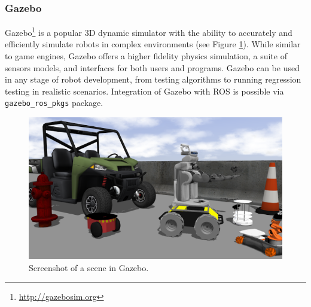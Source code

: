 \subsubsection{Gazebo} 
Gazebo\footnote{\url{http://gazebosim.org}} is a popular 3D dynamic simulator with the ability to accurately and efficiently simulate robots in complex environments (see Figure \ref{gazebo_screenshot}). While similar to game engines, Gazebo offers a higher fidelity physics simulation, a suite of sensors models, and interfaces for both users and programs. Gazebo can be used in any stage of robot development, from testing algorithms to running regression testing in realistic scenarios.
Integration of Gazebo with ROS is possible via \texttt{gazebo\_ros\_pkgs} package. 
 
\begin{figure}[ht] 
    \centering 
    \includegraphics[width=0.9\linewidth]{tex/figs/ch24_figs/Gazebo.PNG}
    \caption{Screenshot of a scene in Gazebo.}
    \label{gazebo_screenshot} 
\end{figure} 
